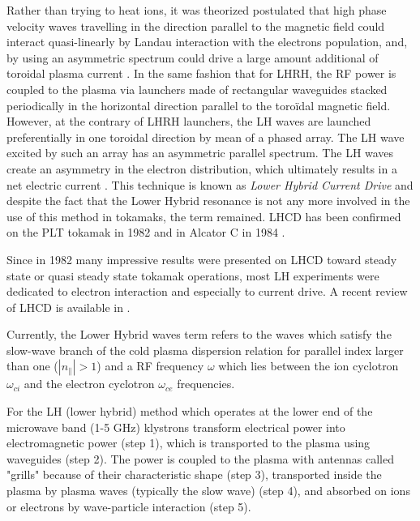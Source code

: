 Rather than trying to heat ions, it was theorized postulated that high phase velocity waves travelling in the direction parallel to the magnetic field could interact quasi-linearly by Landau interaction with the electrons population, and, by using an asymmetric spectrum could drive a large amount additional of toroidal plasma current . In the same fashion that for LHRH, the RF power is coupled to the plasma via launchers made of rectangular waveguides stacked periodically in the horizontal direction parallel to the toroïdal magnetic field. However, at the contrary of LHRH launchers, the LH waves are launched preferentially in one toroidal direction by mean of a phased array. The LH wave excited by such an array has an asymmetric parallel spectrum. The LH waves create an asymmetry in the electron distribution, which ultimately results in a net electric current . This technique is known as \emph{Lower Hybrid Current Drive} and despite the fact that the Lower Hybrid resonance is not any more involved in the use of this method in tokamaks, the term remained. LHCD has been confirmed on the PLT tokamak in 1982  and in Alcator C in 1984 . 

Since in 1982 many impressive results were presented on LHCD toward steady state or quasi steady state tokamak operations, most LH experiments were dedicated to electron interaction and especially to current drive. A recent review of LHCD is available in .

Currently, the Lower Hybrid waves term refers to the waves which satisfy the slow-wave branch of the cold plasma dispersion relation for parallel index larger than one ($|n_{\parallel}|>1$) and a RF frequency $\omega$ which lies between the ion cyclotron $\omega_{ci}$ and the electron cyclotron $\omega_{ce}$ frequencies. 

For the LH (lower hybrid) method which operates at the lower end of the microwave band (1-5 GHz) klystrons transform electrical power into electromagnetic power (step 1), which is transported to the plasma using waveguides (step 2). The power is coupled to the plasma with antennas called "grills" because of their characteristic shape (step 3), transported inside the plasma by plasma waves (typically the slow wave) (step 4), and absorbed on ions or electrons by wave-particle interaction (step 5).



